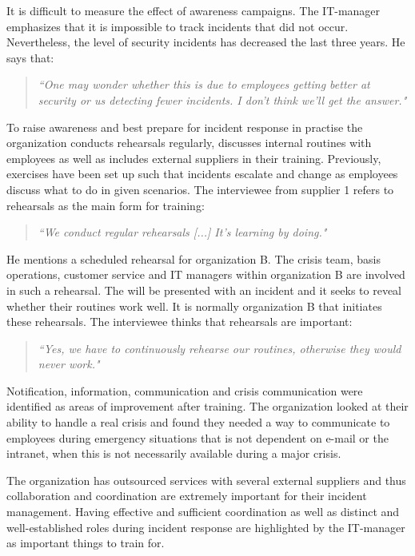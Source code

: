 It is difficult to measure the effect of awareness campaigns. The IT-manager emphasizes that it is impossible to track incidents that did not occur. Nevertheless, the level of security incidents has decreased the last three years. He says that:
\begin{quote}
\textit{``One may wonder whether this is due to employees getting better at security or us detecting fewer incidents. I don't think we'll get the answer."}
\end{quote}
 
To raise awareness and best prepare for incident response in practise the organization conducts rehearsals regularly, discusses internal routines with employees as well as includes external suppliers in their training. Previously, exercises have been set up such that incidents escalate and change as employees discuss what to do in given scenarios. The interviewee from supplier 1 refers to rehearsals as the main form for training:

\begin{quote}
\textit{``We conduct regular rehearsals [...] It's learning by doing."}
\end{quote}

He mentions a scheduled rehearsal for organization B. The crisis team, basis operations, customer service and IT managers within organization B are involved in such a rehearsal. The will be presented with an incident and it seeks to reveal whether their routines work well. It is normally organization B that initiates these rehearsals. The interviewee thinks that rehearsals are important:

\begin{quote}
\textit{``Yes, we have to continuously rehearse our routines, otherwise they would never work."}
\end{quote}

Notification, information, communication and crisis communication were identified as areas of improvement after training. The organization looked at their ability to handle a real crisis and found they needed a way to communicate to employees during emergency situations that is not dependent on e-mail or the intranet, when this is not necessarily available during a major crisis.

The organization has outsourced services with several external suppliers and thus collaboration and coordination are extremely important for their incident management. Having effective and sufficient coordination as well as distinct and well-established roles during incident response are highlighted by the IT-manager as important things to train for.


